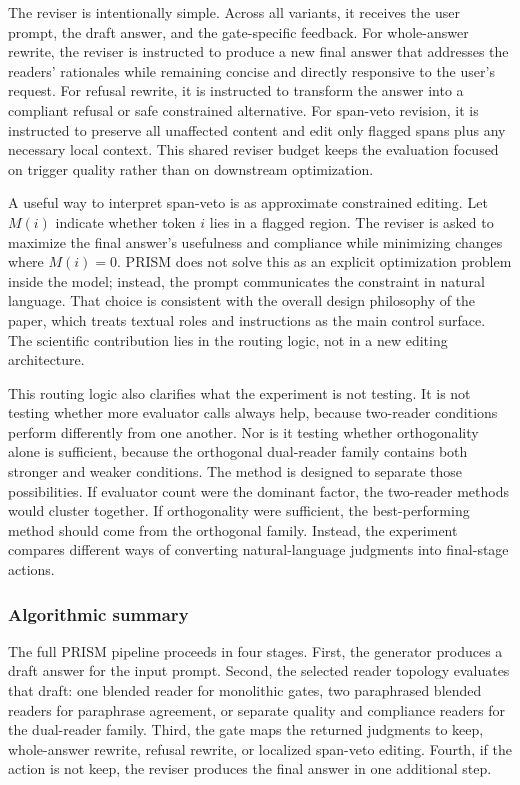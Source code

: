 \documentclass{article}
\begin{document}
\label{sec:revision_behavior_and_scope_control}

The reviser is intentionally simple. Across all variants, it receives the user prompt, the draft answer, and the gate-specific feedback. For whole-answer rewrite, the reviser is instructed to produce a new final answer that addresses the readers' rationales while remaining concise and directly responsive to the user's request. For refusal rewrite, it is instructed to transform the answer into a compliant refusal or safe constrained alternative. For span-veto revision, it is instructed to preserve all unaffected content and edit only flagged spans plus any necessary local context. This shared reviser budget keeps the evaluation focused on trigger quality rather than on downstream optimization.

A useful way to interpret span-veto is as approximate constrained editing. Let \(M(i)\) indicate whether token \(i\) lies in a flagged region. The reviser is asked to maximize the final answer's usefulness and compliance while minimizing changes where \(M(i)=0\). PRISM does not solve this as an explicit optimization problem inside the model; instead, the prompt communicates the constraint in natural language. That choice is consistent with the overall design philosophy of the paper, which treats textual roles and instructions as the main control surface. The scientific contribution lies in the routing logic, not in a new editing architecture.

This routing logic also clarifies what the experiment is not testing. It is not testing whether more evaluator calls always help, because two-reader conditions perform differently from one another. Nor is it testing whether orthogonality alone is sufficient, because the orthogonal dual-reader family contains both stronger and weaker conditions. The method is designed to separate those possibilities. If evaluator count were the dominant factor, the two-reader methods would cluster together. If orthogonality were sufficient, the best-performing method should come from the orthogonal family. Instead, the experiment compares different ways of converting natural-language judgments into final-stage actions.

\subsubsection{Algorithmic summary}

\label{sec:algorithmic_summary}

The full PRISM pipeline proceeds in four stages. First, the generator produces a draft answer for the input prompt. Second, the selected reader topology evaluates that draft: one blended reader for monolithic gates, two paraphrased blended readers for paraphrase agreement, or separate quality and compliance readers for the dual-reader family. Third, the gate maps the returned judgments to keep, whole-answer rewrite, refusal rewrite, or localized span-veto editing. Fourth, if the action is not keep, the reviser produces the final answer in one additional step.
\end{document}
